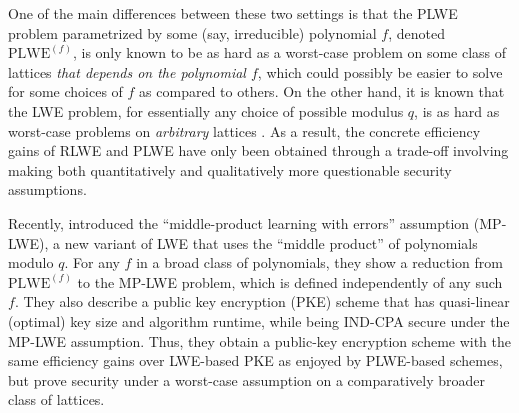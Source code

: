 \documentclass[11pt]{article}
\newcommand{\Z}{\mathbb{Z}}
\newcommand{\vnote}[1]{\textcolor{red}{Vinod's note: {#1}}}
\begin{document}
One of the main differences between these two settings is that the PLWE problem parametrized by some (say, irreducible) polynomial $f$, denoted $\text{PLWE}^{(f)}$, is only known to be as hard as a worst-case problem on some class of lattices \emph{that depends on the polynomial $f$}, which could possibly be easier to solve for some choices of $f$ as compared to others. %
On the other hand, it is known that the LWE problem, for essentially any choice of possible modulus $q$, is as hard as worst-case problems on \emph{arbitrary} lattices \cite{Reg05, PRSD17}. As a result, the concrete efficiency gains of RLWE and PLWE have only been obtained through a trade-off involving making both quantitatively and qualitatively more questionable security assumptions.



Recently, \cite{MPLWE} introduced the ``middle-product learning with errors'' assumption (MP-LWE), a new variant of LWE that uses the ``middle product'' of polynomials modulo $q.$ For any $f$ in a broad class of polynomials, they show a reduction from $\text{PLWE}^{(f)}$ to the MP-LWE problem, which is defined independently of any such $f.$ They also describe a public key encryption (PKE) scheme that has quasi-linear (optimal) key size and algorithm runtime, while being IND-CPA secure under the MP-LWE assumption. Thus, they obtain a public-key encryption scheme with the same efficiency gains over LWE-based PKE as enjoyed by PLWE-based schemes, but prove security under a worst-case assumption on a comparatively broader class of lattices. %

\end{document}
